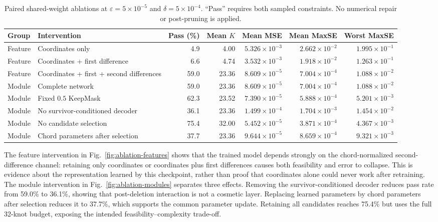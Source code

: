 \documentclass[preprint,12pt]{elsarticle}
\begin{document}
\begin{table}[t]
\centering
\small
\setlength{\tabcolsep}{4pt}
\caption{Paired shared-weight ablations at
$\varepsilon=5\times10^{-5}$ and $\delta=5\times10^{-4}$. ``Pass'' requires
both sampled constraints. No numerical repair or post-pruning is applied.}
\label{tab:paired-ablation}
\begin{tabular}{llrrrrr}
\toprule
Group & Intervention & Pass (\%) & Mean $K$ & Mean MSE & Mean MaxSE & Worst MaxSE \\
\midrule
Feature & Coordinates only & 4.9 & 4.00 & $5.326\times10^{-3}$ & $2.662\times10^{-2}$ & $1.995\times10^{-1}$ \\
Feature & Coordinates + first difference & 6.6 & 4.74 & $3.532\times10^{-3}$ & $1.918\times10^{-2}$ & $1.263\times10^{-1}$ \\
Feature & Coordinates + first + second differences & 59.0 & 23.36 & $8.609\times10^{-5}$ & $7.004\times10^{-4}$ & $1.088\times10^{-2}$ \\
\midrule
Module & Complete network & 59.0 & 23.36 & $8.609\times10^{-5}$ & $7.004\times10^{-4}$ & $1.088\times10^{-2}$ \\
Module & Fixed $0.5$ KeepMask & 62.3 & 23.52 & $7.390\times10^{-5}$ & $5.888\times10^{-4}$ & $5.201\times10^{-3}$ \\
Module & No survivor-conditioned decoder & 36.1 & 23.36 & $1.499\times10^{-4}$ & $1.704\times10^{-3}$ & $1.454\times10^{-2}$ \\
Module & No candidate selection & 75.4 & 32.00 & $5.452\times10^{-5}$ & $3.871\times10^{-4}$ & $4.367\times10^{-3}$ \\
Module & Chord parameters after selection & 37.7 & 23.36 & $9.644\times10^{-5}$ & $8.659\times10^{-4}$ & $9.321\times10^{-3}$ \\
\bottomrule
\end{tabular}
\end{table}

The feature intervention in Fig.~\ref{fig:ablation-features} shows that the
trained model depends strongly on the chord-normalized second-difference
channel: retaining only coordinates or coordinates plus first differences
causes both feasibility and error to collapse. This is evidence about the
representation learned by this checkpoint, rather than proof that coordinates
alone could never work after retraining. The module intervention in
Fig.~\ref{fig:ablation-modules} separates three effects. Removing the
survivor-conditioned decoder reduces pass rate from 59.0\% to 36.1\%, showing
that post-deletion interaction is not a cosmetic layer. Replacing learned
parameters by chord parameters after selection reduces it to 37.7\%, which
supports the common parameter update. Retaining all candidates reaches 75.4\%
but uses the full 32-knot budget, exposing the intended feasibility--complexity
trade-off.
\end{document}
